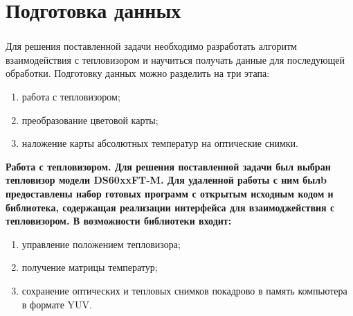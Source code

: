 \documentclass[t]{beamer}
\begin{document}
\section{Подготовка данных}

	\begin{frame}
		\frametitle{\insertsection} 
		Для решения поставленной задачи необходимо разработать алгоритм взаимодействия с тепловизором и научиться получать данные для последующей обработки. Подготовку данных можно разделить на три этапа:
		\begin{enumerate}
			\item работа с тепловизором;
			\item преобразование цветовой карты;
			\item наложение карты абсолютных температур на оптические снимки.
		\end{enumerate}
	\end{frame}


	\begin{frame}
		\bfseries Работа с тепловизором. \normalfont
		Для решения поставленной задачи был выбран тепловизор модели DS60xxFT-M. Для удаленной работы с ним былb предоставлены набор готовых программ с открытым исходным кодом и библиотека, содержащая реализации интерфейса для взаимоджействия с тепловизором. В возможности библиотеки входит:
		\begin{enumerate}
			\item управление положением тепловизора;
			\item получение матрицы температур;
			\item сохранение оптических и тепловых снимков покадрово в память компьютера в формате YUV.
		\end{enumerate}
	\end{frame}
\end{document}
